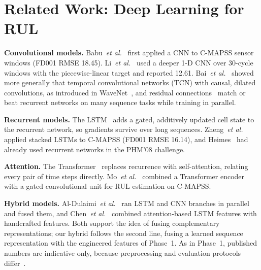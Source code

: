 \section{Related Work: Deep Learning for RUL}
\textbf{Convolutional models.} Babu~\emph{et al.}~\cite{babu2016cnn} first applied a CNN to C-MAPSS sensor windows (FD001 RMSE 18.45). Li~\emph{et al.}~\cite{li2018dcnn} used a deeper 1-D CNN over 30-cycle windows with the piecewise-linear target and reported 12.61. Bai~\emph{et al.}~\cite{bai2018tcn} showed more generally that temporal convolutional networks (TCN) with causal, dilated convolutions, as introduced in WaveNet~\cite{oord2016wavenet}, and residual connections~\cite{he2016resnet} match or beat recurrent networks on many sequence tasks while training in parallel.

\textbf{Recurrent models.} The LSTM~\cite{hochreiter1997lstm} adds a gated, additively updated cell state to the recurrent network, so gradients survive over long sequences. Zheng~\emph{et al.}~\cite{zheng2017lstm} applied stacked LSTMs to C-MAPSS (FD001 RMSE 16.14), and Heimes~\cite{heimes2008rnn} had already used recurrent networks in the PHM'08 challenge.

\textbf{Attention.} The Transformer~\cite{vaswani2017attention} replaces recurrence with self-attention, relating every pair of time steps directly. Mo~\emph{et al.}~\cite{mo2021transformer} combined a Transformer encoder with a gated convolutional unit for RUL estimation on C-MAPSS.

\textbf{Hybrid models.} Al-Dulaimi~\emph{et al.}~\cite{aldulaimi2019hdnn} ran LSTM and CNN branches in parallel and fused them, and Chen~\emph{et al.}~\cite{chen2021attention} combined attention-based LSTM features with handcrafted features. Both support the idea of fusing complementary representations; our hybrid follows the second line, fusing a learned sequence representation with the engineered features of Phase~1. As in Phase~1, published numbers are indicative only, because preprocessing and evaluation protocols differ~\cite{ramasso2014benchmark}.
